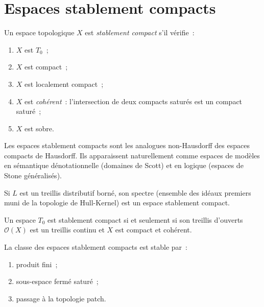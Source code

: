 \section{Espaces stablement compacts}

\begin{definition}
Un espace topologique $X$ est \emph{stablement compact} s'il v\'erifie~:
\begin{enumerate}
  \item $X$ est $T_0$~;
  \item $X$ est compact~;
  \item $X$ est localement compact~;
  \item $X$ est \emph{coh\'erent}~: l'intersection de deux compacts satur\'es est un
    compact satur\'e~;
  \item $X$ est sobre.
\end{enumerate}
\end{definition}

\begin{intuition}
Les espaces stablement compacts sont les analogues non-Hausdorff des espaces compacts de
Hausdorff. Ils apparaissent naturellement comme espaces de mod\`eles en s\'emantique
d\'enotationnelle (domaines de Scott) et en logique (espaces de Stone g\'en\'eralis\'es).
\end{intuition}

\begin{exemple}
Si $L$ est un treillis distributif born\'e, son spectre (ensemble des id\'eaux premiers muni
de la topologie de Hull-Kernel) est un espace stablement compact.
\end{exemple}

\begin{theoreme}
Un espace $T_0$ est stablement compact si et seulement si son treillis d'ouverts
$\mathcal{O}(X)$ est un treillis continu et $X$ est compact et coh\'erent.
\end{theoreme}

\begin{proposition}
La classe des espaces stablement compacts est stable par~:
\begin{enumerate}
  \item produit fini~;
  \item sous-espace ferm\'e satur\'e~;
  \item passage \`a la topologie patch.
\end{enumerate}
\end{proposition}

